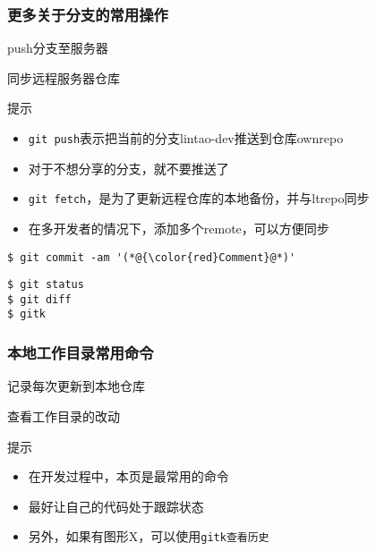 \begin{frame}
    \frametitle{更多关于分支的常用操作}
    \begin{block}{push分支至服务器}
        \par\usebox{\QuickStartDybDevBranchPush}
    \end{block}
    \begin{block}{同步远程服务器仓库}
        \par\usebox{\QuickStartDybDevBranchFetch}
    \end{block}
    \begin{alertblock}{提示}
        \begin{itemize}    
            \item {\tt git push}表示把当前的分支{\color{red}lintao-dev}推送到仓库{\color{red}ownrepo}
            \item 对于不想分享的分支，就不要推送了
            \item {\tt git fetch}，是为了更新远程仓库的本地备份，并与{\color{red}ltrepo}同步
            \item 在多开发者的情况下，添加多个remote，可以方便同步
        \end{itemize}
    \end{alertblock}
\end{frame}

\newsavebox{\QuickStartDybDevCommit}
\begin{lrbox}{\QuickStartDybDevCommit}
\begin{lstlisting}
$ git commit -am '(*@{\color{red}Comment}@*)' 
\end{lstlisting}
\end{lrbox}

\newsavebox{\QuickStartDybDevStatus}
\begin{lrbox}{\QuickStartDybDevStatus}
\begin{lstlisting}
$ git status
$ git diff
$ gitk
\end{lstlisting}
\end{lrbox}

\begin{frame}
    \frametitle{本地工作目录常用命令}
    \begin{block}{记录每次更新到本地仓库}
        \par\usebox{\QuickStartDybDevCommit}
    \end{block}
    \begin{block}{查看工作目录的改动}
        \par\usebox{\QuickStartDybDevStatus}
    \end{block}
    \begin{alertblock}{提示}
        \begin{itemize}    
            \item 在开发过程中，本页是最常用的命令
            \item 最好让自己的代码处于跟踪状态
            \item 另外，如果有图形X，可以使用\tt{gitk}查看历史
        \end{itemize}
    \end{alertblock}
\end{frame}

